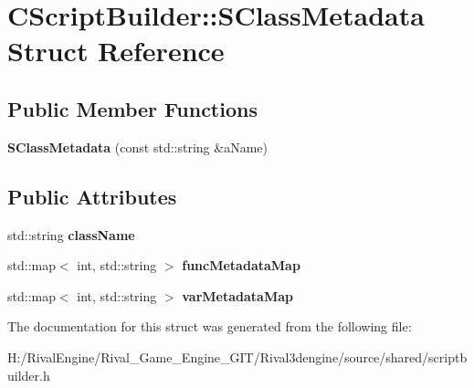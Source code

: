 \hypertarget{struct_c_script_builder_1_1_s_class_metadata}{}\section{C\+Script\+Builder\+:\+:S\+Class\+Metadata Struct Reference}
\label{struct_c_script_builder_1_1_s_class_metadata}
\subsection*{Public Member Functions}
\begin{DoxyCompactItemize}
\item 
\mbox{\label{struct_c_script_builder_1_1_s_class_metadata_ab1269a60f35ed9b9b501e04d905a78bb}} 
{\bfseries S\+Class\+Metadata} (const std\+::string \&a\+Name)
\end{DoxyCompactItemize}
\subsection*{Public Attributes}
\begin{DoxyCompactItemize}
\item 
\mbox{\label{struct_c_script_builder_1_1_s_class_metadata_afd2441fe0a94a77c21ed84993b7565fd}} 
std\+::string {\bfseries class\+Name}
\item 
\mbox{\label{struct_c_script_builder_1_1_s_class_metadata_aedf441522fa48b260d36d739747be421}} 
std\+::map$<$ int, std\+::string $>$ {\bfseries func\+Metadata\+Map}
\item 
\mbox{\label{struct_c_script_builder_1_1_s_class_metadata_ade82281d4c943ba6967ae141100e586f}} 
std\+::map$<$ int, std\+::string $>$ {\bfseries var\+Metadata\+Map}
\end{DoxyCompactItemize}


The documentation for this struct was generated from the following file\+:\begin{DoxyCompactItemize}
\item 
H\+:/\+Rival\+Engine/\+Rival\+\_\+\+Game\+\_\+\+Engine\+\_\+\+G\+I\+T/\+Rival3dengine/source/shared/scriptbuilder.\+h\end{DoxyCompactItemize}
